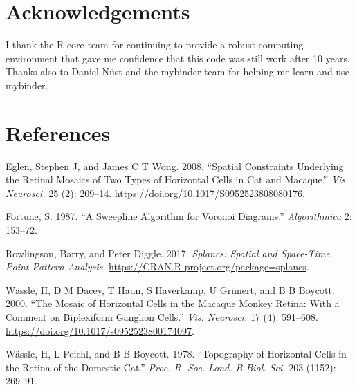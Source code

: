 \documentclass[
]{article}
\newlength{\cslhangindent}
\newlength{\cslentryspacingunit} %
\newenvironment{CSLReferences}[2] %
 {%
  \setlength{\parindent}{0pt}
  \ifodd #1
  \let\oldpar\par
  \def\par{\hangindent=\cslhangindent\oldpar}
  \fi
  \setlength{\parskip}{#2\cslentryspacingunit}
 }%
 {}
\begin{document}
\hypertarget{acknowledgements}{%
\section{Acknowledgements}\label{acknowledgements}}

I thank the R core team for continuing to provide a robust computing
environment that gave me confidence that this code was still work after
10 years. Thanks also to Daniel Nüst and the mybinder team for helping
me learn and use mybinder.

\clearpage

\hypertarget{references}{%
\section*{References}\label{references}}

\hypertarget{refs}{}
\begin{CSLReferences}{1}{0}
\leavevmode{}%
Eglen, Stephen J, and James C T Wong. 2008. {``Spatial Constraints
Underlying the Retinal Mosaics of Two Types of Horizontal Cells in Cat
and Macaque.''} \emph{Vis. Neurosci.} 25 (2): 209--14.
\url{https://doi.org/10.1017/S0952523808080176}.

\leavevmode{}%
Fortune, S. 1987. {``A Sweepline Algorithm for Voronoi Diagrams.''}
\emph{Algorithmica} 2: 153--72.

\leavevmode{}%
Rowlingson, Barry, and Peter Diggle. 2017. \emph{Splancs: Spatial and
Space-Time Point Pattern Analysis}.
\url{https://CRAN.R-project.org/package=splancs}.

\leavevmode{}%
Wässle, H, D M Dacey, T Haun, S Haverkamp, U Grünert, and B B Boycott.
2000. {``The Mosaic of Horizontal Cells in the Macaque Monkey Retina:
With a Comment on Biplexiform Ganglion Cells.''} \emph{Vis. Neurosci.}
17 (4): 591--608. \url{https://doi.org/10.1017/s0952523800174097}.

\leavevmode{}%
Wässle, H, L Peichl, and B B Boycott. 1978. {``Topography of Horizontal
Cells in the Retina of the Domestic Cat.''} \emph{Proc. R. Soc. Lond. B
Biol. Sci.} 203 (1152): 269--91.

\end{CSLReferences}
\end{document}
